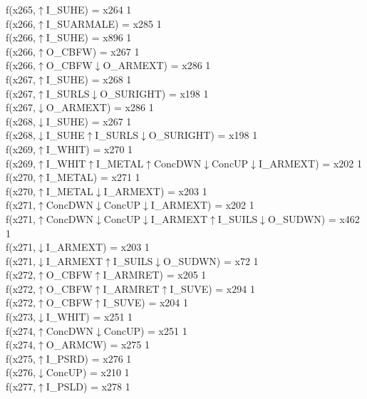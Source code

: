 f(x265,$\uparrow$I\_SUHE) = x264 {1} \\
f(x266,$\uparrow$I\_SUARMALE) = x285 {1} \\
f(x266,$\uparrow$I\_SUHE) = x896 {1} \\
f(x266,$\uparrow$O\_CBFW) = x267 {1} \\
f(x266,$\uparrow$O\_CBFW$\downarrow$O\_ARMEXT) = x286 {1} \\
f(x267,$\uparrow$I\_SUHE) = x268 {1} \\
f(x267,$\uparrow$I\_SURLS$\downarrow$O\_SURIGHT) = x198 {1} \\
f(x267,$\downarrow$O\_ARMEXT) = x286 {1} \\
f(x268,$\downarrow$I\_SUHE) = x267 {1} \\
f(x268,$\downarrow$I\_SUHE$\uparrow$I\_SURLS$\downarrow$O\_SURIGHT) = x198 {1} \\
f(x269,$\uparrow$I\_WHIT) = x270 {1} \\
f(x269,$\uparrow$I\_WHIT$\uparrow$I\_METAL$\uparrow$ConcDWN$\downarrow$ConcUP$\downarrow$I\_ARMEXT) = x202 {1} \\
f(x270,$\uparrow$I\_METAL) = x271 {1} \\
f(x270,$\uparrow$I\_METAL$\downarrow$I\_ARMEXT) = x203 {1} \\
f(x271,$\uparrow$ConcDWN$\downarrow$ConcUP$\downarrow$I\_ARMEXT) = x202 {1} \\
f(x271,$\uparrow$ConcDWN$\downarrow$ConcUP$\downarrow$I\_ARMEXT$\uparrow$I\_SUILS$\downarrow$O\_SUDWN) = x462 {1} \\
f(x271,$\downarrow$I\_ARMEXT) = x203 {1} \\
f(x271,$\downarrow$I\_ARMEXT$\uparrow$I\_SUILS$\downarrow$O\_SUDWN) = x72 {1} \\
f(x272,$\uparrow$O\_CBFW$\uparrow$I\_ARMRET) = x205 {1} \\
f(x272,$\uparrow$O\_CBFW$\uparrow$I\_ARMRET$\uparrow$I\_SUVE) = x294 {1} \\
f(x272,$\uparrow$O\_CBFW$\uparrow$I\_SUVE) = x204 {1} \\
f(x273,$\downarrow$I\_WHIT) = x251 {1} \\
f(x274,$\uparrow$ConcDWN$\downarrow$ConcUP) = x251 {1} \\
f(x274,$\uparrow$O\_ARMCW) = x275 {1} \\
f(x275,$\uparrow$I\_PSRD) = x276 {1} \\
f(x276,$\downarrow$ConcUP) = x210 {1} \\
f(x277,$\uparrow$I\_PSLD) = x278 {1} \\
